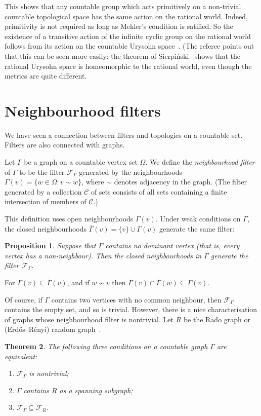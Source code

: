 \documentclass[12pt]{article}
\newtheorem{theorem}{Theorem}[section]
\newtheorem{prop}[theorem]{Proposition}
\begin{document}
This shows that any countable group which acts primitively on a non-trivial
countable topological space has the same action on the rational world. 
Indeed, primitivity is not required as long as Mekler's condition is
satified. So the existence of a transitive action of the infinite cyclic group
on the rational world~\cite{rational} follows from its action on the countable
Urysohn space~\cite{cv}. (The referee points out that this can be seen more
easily: the theorem of Sierpi\'nski~\cite{s:rat} shows that the rational
Urysohn space is homeomorphic to the rational world, even though the metrics
are quite different.

\section{Neighbourhood filters}

We have seen a connection between filters and topologies on a countable set.
Filters are also connected with graphs. 

Let $\Gamma$ be a graph on a countable vertex set $\Omega$. We define the
\emph{neighbourhood filter} of $\Gamma$ to be the filter $\mathcal{F}_\Gamma$
generated by the neighbourhoods $\Gamma(v)=\{w\in\Omega: v\sim w\}$, where 
$\sim$ denotes adjacency in the graph. (The filter generated by a collection
$\mathcal{C}$ of sets consists of all sets containing a finite intersection
of members of $\mathcal{C}$.)

This definition uses open neighbourhoods $\Gamma(v)$. Under weak conditions
on $\Gamma$, the closed neighbourhoods $\bar\Gamma(v)=\{v\}\cup\Gamma(v)$
generate the same filter:

\begin{prop}
Suppose that $\Gamma$ contains no dominant vertex (that is, every vertex has
a non-neighbour). Then the closed neighbourhoods in $\Gamma$ generate the
filter $\mathcal{F}_\Gamma$.
\end{prop}

For $\Gamma(v)\subseteq \bar\Gamma(v)$, and if $w\not\sim v$ then
$\bar\Gamma(v)\cap\bar\Gamma(w)\subseteq\Gamma(v)$.

Of course, if $\Gamma$ contains two vertices with no common neighbour, then
$\mathcal{F}_\Gamma$ contains the empty set, and so is trivial. However, there
is a nice characterisation of graphs whose neighbourhood filter is nontrivial.
Let $R$ be the Rado graph or (Erd\H{o}s--R\'enyi) random graph~\cite{randgr}.

\begin{theorem}
The following three conditions on a countable graph $\Gamma$ are equivalent:
\begin{enumerate}
\item $\mathcal{F}_\Gamma$ is nontrivial;
\item $\Gamma$ contains $R$ as a spanning subgraph;
\item $\mathcal{F}_\Gamma\subseteq\mathcal{F}_R$.
\end{enumerate}
\end{theorem}
\end{document}
